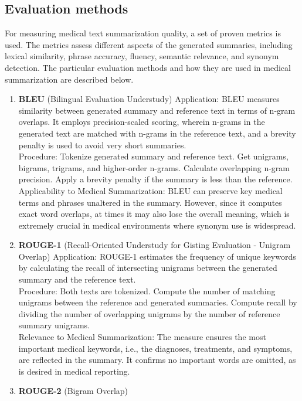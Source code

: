 \subsection{Evaluation methods}
For measuring medical text summarization quality, a set of proven metrics is used. The metrics assess different aspects of the generated summaries, including lexical similarity, phrase accuracy, fluency, semantic relevance, and synonym detection. The particular evaluation methods and how they are used in medical summarization are described below.
\begin{enumerate}
    \item \textbf{BLEU} (Bilingual Evaluation Understudy)
Application: BLEU measures similarity between generated summary and reference text in terms of n-gram overlaps. It employs precision-scaled scoring, wherein n-grams in the generated text are matched with n-grams in the reference text, and a brevity penalty is used to avoid very short summaries.
\\
Procedure:
Tokenize generated summary and reference text.
Get unigrams, bigrams, trigrams, and higher-order n-grams.
Calculate overlapping n-gram precision.
Apply a brevity penalty if the summary is less than the reference.
\\
Applicability to Medical Summarization: BLEU can preserve key medical terms and phrases unaltered in the summary. However, since it computes exact word overlaps, at times it may also lose the overall meaning, which is extremely crucial in medical environments where synonym use is widespread.
\\
    \item \textbf{ROUGE-1} (Recall-Oriented Understudy for Gisting Evaluation - Unigram Overlap)
Application: ROUGE-1 estimates the frequency of unique keywords by calculating the recall of intersecting unigrams between the generated summary and the reference text.
\\
Procedure:
Both texts are tokenized.
Compute the number of matching unigrams between the reference and generated summaries.
Compute recall by dividing the number of overlapping unigrams by the number of reference summary unigrams.
\\
Relevance to Medical Summarization: The measure ensures the most important medical keywords, i.e., the diagnoses, treatments, and symptoms, are reflected in the summary. It confirms no important words are omitted, as is desired in medical reporting.
\\
    \item \textbf{ROUGE-2} (Bigram Overlap)

\end{enumerate}
